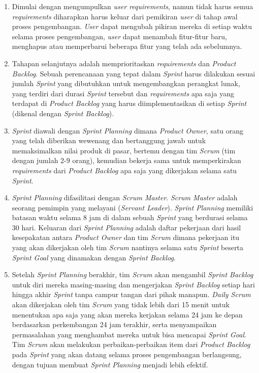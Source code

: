 \begin {enumerate}[1.]
\item Dimulai dengan mengumpulkan \textit{user requirements}, namun tidak harus semua \textit{requirements} diharapkan harus keluar dari pemikiran \textit{user} di tahap awal proses pengembangan. \textit{User} dapat mengubah pikiran mereka di setiap waktu selama proses pengembangan, \textit{user} dapat menambah fitur-fitur baru, menghapus atau memperbarui beberapa fitur yang telah ada sebelumnya.
\item Tahapan selanjutnya adalah memprioritaskan \textit{requirements} dan \textit{Product Backlog}. Sebuah perencanaan yang tepat dalam \textit{Sprint} harus dilakukan sesuai jumlah \textit{Sprint} yang dibutuhkan untuk mengembangkan perangkat lunak, yang terdiri dari durasi \textit{Sprint} tersebut dan \textit{requirements} apa saja yang terdapat di \textit{Product Backlog} yang harus diimplementasikan di setiap \textit{Sprint} (dikenal dengan \textit{Sprint Backlog}).
\item \textit{Sprint} diawali dengan \textit{Sprint Planning} dimana \textit{Product Owner}, satu orang yang telah diberikan wewenang dan bertanggung jawab untuk memaksimalkan nilai produk di pasar, bertemu dengan tim \textit{Scrum} (tim dengan jumlah 2-9 orang), kemudian bekerja sama untuk memperkirakan \textit{requirements} dari \textit{Product Backlog} apa saja yang dikerjakan selama satu \textit{Sprint}.
\item \textit{Sprint Planning} difasilitasi dengan \textit{Scrum Master}. \textit{Scrum Master} adalah seorang pemimpin yang melayani (\textit{Servant Leader}). \textit{Sprint Planning} memiliki batasan waktu selama 8 jam di dalam sebuah \textit{Sprint} yang berdurasi selama 30 hari. Keluaran dari \textit{Sprint Planning} adalah daftar pekerjaan dari hasil kesepakatan antara \textit{Product Owner} dan tim \textit{Scrum} dimana pekerjaan itu yang akan dikerjakan oleh tim \textit{Scrum} nantinya selama satu \textit{Sprint} beserta \textit{Sprint Goal} yang dinamakan dengan \textit{Sprint Backlog}.
\item Setelah \textit{Sprint Planning} berakhir, tim \textit{Scrum} akan mengambil \textit{Sprint Backlog} untuk diri mereka masing-masing dan mengerjakan \textit{Sprint Backlog} setiap hari hingga akhir \textit{Sprint} tanpa campur tangan dari pihak manapun. \textit{Daily Scrum} akan dikerjakan oleh tim \textit{Scrum} yang tidak lebih dari 15 menit untuk menentukan apa saja yang akan mereka kerjakan selama 24 jam ke depan berdasarkan perkembangan 24 jam terakhir, serta menyampaikan permasalahan yang menghambat mereka untuk bisa mencapai \textit{Sprint Goal}. Tim \textit{Scrum} akan melakukan perbaikan-perbaikan item dari \textit{Product Backlog} pada \textit{Sprint} yang akan datang selama proses pengembangan berlangsung, dengan tujuan membuat \textit{Sprint Planning} menjadi lebih efektif.

\end{enumerate}
